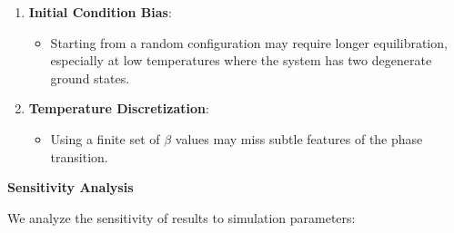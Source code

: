 \documentclass[11pt]{article}
\providecommand{\tightlist}{%
      \setlength{\itemsep}{0pt}\setlength{\parskip}{0pt}}
\begin{document}
\begin{enumerate}
  \begin{itemize}
  \tightlist
  \item
    Periodic boundary conditions minimize finite-size effects but
    introduce artificial long-range correlations for small lattices.
  \end{itemize}
\item
  \textbf{Initial Condition Bias}:

  \begin{itemize}
  \tightlist
  \item
    Starting from a random configuration may require longer
    equilibration, especially at low temperatures where the system has
    two degenerate ground states.
  \end{itemize}
\item
  \textbf{Temperature Discretization}:

  \begin{itemize}
  \tightlist
  \item
    Using a finite set of \(\beta\) values may miss subtle features of
    the phase transition.
  \end{itemize}
\end{enumerate}

\textbf{Sensitivity Analysis}

We analyze the sensitivity of results to simulation parameters:
\end{document}

